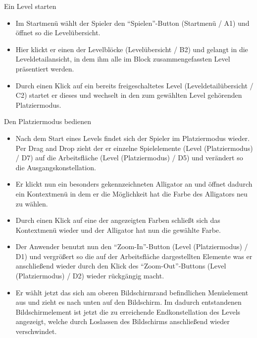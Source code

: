 \begin{requirements}
\begin{itemize}
	\end{itemize}
	

	 Ein Level starten
	
	
	\begin{itemize}
  			\item Im Startmenü wählt der Spieler den "`Spielen"'-Button (Startmenü / A1) und öffnet so die Levelübersicht.
  			
  			\item Hier klickt er einen der Levelblöcke (Levelübersicht / B2) und gelangt in die Leveldetailansicht, in dem ihm alle im Block zusammengefassten Level präsentiert werden.
  			
  			\item Durch einen Klick auf ein bereits freigeschaltetes Level (Leveldetailübersicht / C2) startet er dieses und wechselt in den zum gewählten Level gehörenden Platziermodus.
  	\end{itemize}
  	
  	
  	
  	 Den Platziermodus bedienen
  	
	
	\begin{itemize}
			\item Nach dem Start eines Levels findet sich der Spieler im Platziermodus wieder. Per Drag and Drop zieht der er einzelne Spielelemente (Level (Platziermodus) / D7) auf die Arbeitsfläche (Level (Platziermodus) / D5) und verändert so die Ausgangskonstellation.
  			
  			\item Er klickt nun ein besonders gekennzeichneten Alligator an und öffnet dadurch ein Kontextmenü in dem er die Möglichkeit hat die Farbe des Alligators neu zu wählen.
  			
  			\item Durch einen Klick auf eine der angezeigten Farben schließt sich das Kontextmenü wieder und der Alligator hat nun die gewählte Farbe.
  			
  			\item Der Anwender benutzt nun den "`Zoom-In"'-Button (Level (Platziermodus) / D1) und vergrößert so die auf der Arbeitsfläche dargestellten Elemente was er anschließend wieder durch den Klick des "`Zoom-Out"'-Buttons  (Level (Platziermodus) / D2) wieder rückgängig macht.
  			
  			\item Er wählt jetzt das sich am oberen Bildschirmrand befindlichen Menüelement aus und zieht es nach unten auf den Bildschirm. Im dadurch entstandenen Bildschirmelement ist jetzt die zu erreichende Endkonstellation des Levels angezeigt, welche durch Loslassen des Bildschirms anschließend wieder verschwindet. 
  			

\end{itemize}
\end{requirements}
